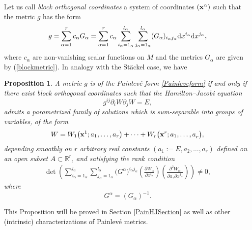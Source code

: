 \documentclass[pdftex]{sigma}
\numberwithin{equation}{section}
\newtheorem{Proposition}[Theorem]{Proposition}
 { \theoremstyle{definition}
\newtheorem{Definition}[Theorem]{Definition}
\newtheorem{Example}[Theorem]{Example}
\newtheorem{Remark}[Theorem]{Remark} }
\newcommand{\ialpha}{i_{\alpha}}
\newcommand{\jalpha}{j_{\alpha}}
\newcommand{\lalpha}{l_{\alpha}}
\begin{document}
Let us call \emph{block orthogonal coordinates} a system of coordinates $({\bf x}^{\alpha})$ such that the metric $g$ has the form
\begin{gather*} %
 g=\sum_{\alpha =1}^{r} c_\alpha G_\alpha = \sum_{\alpha =1}^{r} c_\alpha \sum_{\ialpha = 1_{\alpha}}^{\lalpha}\sum_{\jalpha = 1_{\alpha}}^{\lalpha}(G_{\alpha})_{i_{\alpha}j_{\alpha}}{\rm d}x^{i_{\alpha}}{\rm d}x^{j_{\alpha}},
\end{gather*}
where $c_\alpha$ are non-vanishing scalar functions on $M$ and the metrics $G_\alpha$ are given by (\ref{blockmetric}).
In analogy with the St\"ackel case, we have

\begin{Proposition} \label{HJSeparability-Painleve}A metric $g$ is of the Painlev\'e form \eqref{Painleveform} if and only if there exist block orthogonal coordinates such that the Hamilton--Jacobi equation
\[
g^{ij}\partial_{i}W\partial_{j}W=E,
\]
admits a parametrized family of solutions which is sum-separable into groups of variables, of the form
\begin{gather}\label{Painsepform}
W=W_{1}\big({\bf {x}}^{1};{{a}}_{1},\dots ,{{a}}_{r}\big)+\cdots+W_{r}\big({\bf {x}}^{r};{{{a}}_{1},\dots, {a}}_{r}\big),
\end{gather}
depending smoothly on $r$ arbitrary real constants $({{a}}_{1}:=E,a_{2},\dots ,{{a}}_{r})$ defined on an open subset $A\subset \mathbb{R}^{r}$, and satisfying the rank condition
\begin{gather}\label{rankPainHJ}
\det \left(\sum_{\ialpha =1_{\alpha}}^{\lalpha}\sum_{\jalpha =1_{\alpha}}^{\lalpha}\big(G^{\alpha}\big)^{\ialpha \jalpha}\left(\frac{\partial W_{\alpha}}{\partial x^{\ialpha}}\right)\left( \frac{\partial^{2}W_{\alpha}}{\partial a_{\gamma}\partial x^{\jalpha}}\right)\right)\neq 0,
\end{gather}
where
\[
G^{\alpha} = (G_{\alpha})^{-1 }.
\]
\end{Proposition}
This Proposition will be proved in Section \ref{PainHJSection} as well as other (intrinsic) characterizations of Painlev\'e metrics.
\end{document}
